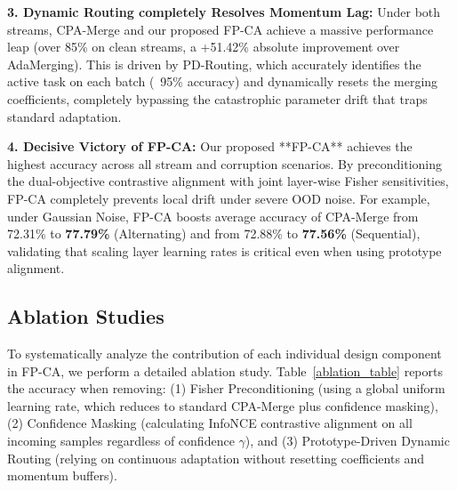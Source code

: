 \documentclass{article}
\theoremstyle{plain}
\theoremstyle{definition}
\theoremstyle{remark}
\begin{document}
\textbf{3. Dynamic Routing completely Resolves Momentum Lag:} Under both streams, CPA-Merge and our proposed FP-CA achieve a massive performance leap (over 85\% on clean streams, a +51.42\% absolute improvement over AdaMerging). This is driven by PD-Routing, which accurately identifies the active task on each batch (~95\% accuracy) and dynamically resets the merging coefficients, completely bypassing the catastrophic parameter drift that traps standard adaptation.

\textbf{4. Decisive Victory of FP-CA:} Our proposed **FP-CA** achieves the highest accuracy across all stream and corruption scenarios. By preconditioning the dual-objective contrastive alignment with joint layer-wise Fisher sensitivities, FP-CA completely prevents local drift under severe OOD noise. For example, under Gaussian Noise, FP-CA boosts average accuracy of CPA-Merge from 72.31\% to \textbf{77.79\%} (Alternating) and from 72.88\% to \textbf{77.56\%} (Sequential), validating that scaling layer learning rates is critical even when using prototype alignment.



\subsection{Ablation Studies}
To systematically analyze the contribution of each individual design component in FP-CA, we perform a detailed ablation study. Table~\ref{ablation_table} reports the accuracy when removing: (1) Fisher Preconditioning (using a global uniform learning rate, which reduces to standard CPA-Merge plus confidence masking), (2) Confidence Masking (calculating InfoNCE contrastive alignment on all incoming samples regardless of confidence $\gamma$), and (3) Prototype-Driven Dynamic Routing (relying on continuous adaptation without resetting coefficients and momentum buffers).
\end{document}
